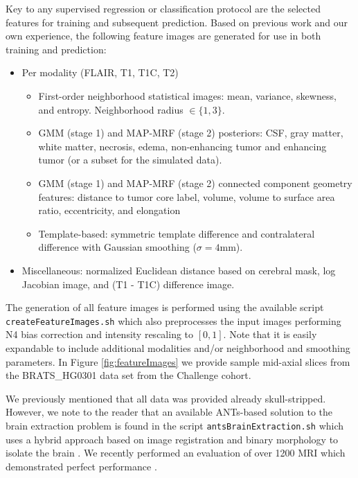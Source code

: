 \documentclass[final,5p,times,twocolumn]{elsarticle}
\begin{document}
Key to any supervised regression or classification protocol are the 
selected features for training and subsequent prediction.  Based on previous
work and our own experience, the following feature images are generated
for use in both training and prediction:
\begin{itemize}
  \item Per modality (FLAIR, T1, T1C, T2)
    \begin{itemize}
      \item First-order neighborhood statistical images:
            mean, variance, skewness, and entropy. 
            Neighborhood radius $\in \{1,3\}$.
    \item GMM (stage 1) and MAP-MRF (stage 2) posteriors: CSF, gray matter, white 
          matter, necrosis, edema, non-enhancing tumor and enhancing tumor (or a
          subset for the simulated data).
    \item GMM (stage 1) and MAP-MRF (stage 2) connected component geometry 
          features:  distance to tumor core label, volume, volume to surface area ratio, eccentricity, and elongation
    \item Template-based:  symmetric template difference and 
          contralateral difference with Gaussian smoothing ($\sigma = 4$mm).
    \end{itemize}
  \item Miscellaneous: normalized Euclidean distance based on cerebral mask,
    log Jacobian image, and  (T1 - T1C) difference image.
\end{itemize}
The generation of all feature images is performed using the available script 
{\tt createFeatureImages.sh} which also preprocesses the input images performing N4
bias correction \citep{tustison2010} and intensity rescaling to $[0,1]$.  Note that 
it is easily expandable to include 
additional modalities and/or neighborhood and smoothing parameters.
In Figure \ref{fig:featureImages}
we provide sample mid-axial slices from the BRATS\_HG0301
data set from the Challenge cohort.  

We previously mentioned that all data was provided already 
skull-stripped.  However, we note to the reader that an
available ANTs-based solution to the brain extraction problem
is found in the script {\tt antsBrainExtraction.sh} which uses
a hybrid approach based on image registration and binary morphology
to isolate the brain \cite{avants2010a}.  We recently performed an evaluation of over 1200
MRI which demonstrated perfect performance \cite{tustison2013a}.
\end{document}
